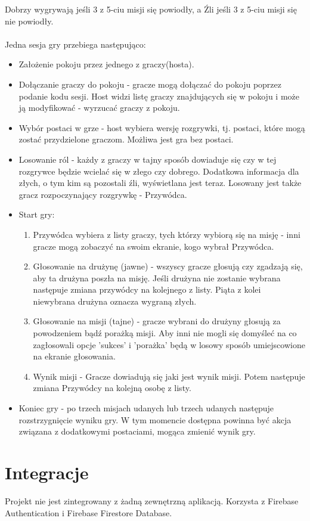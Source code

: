 \documentclass[12pt]{article}
\begin{document}
Dobrzy wygrywają jeśli 3 z 5-ciu misji się powiodły, a Źli jeśli 3 z 5-ciu misji się nie powiodły.
\\\\
Jedna sesja gry przebiega następująco:
\begin{itemize}
    \item Założenie pokoju przez jednego z graczy(hosta).
    \item Dołączanie graczy do pokoju - gracze mogą dołączać do pokoju poprzez podanie kodu sesji. Host widzi listę graczy znajdujących się w pokoju i może ją modyfikować - wyrzucać graczy z pokoju.
    \item Wybór postaci w grze - host wybiera wersję rozgrywki, tj. postaci, które mogą zostać przydzielone graczom. Możliwa jest gra bez postaci.
    \item Losowanie ról - każdy z graczy w tajny sposób dowiaduje się czy w tej rozgrywce będzie wcielać się w złego czy dobrego. Dodatkowa informacja dla złych, o tym kim są pozostali źli, wyświetlana jest teraz. Losowany jest także gracz rozpoczynający rozgrywkę - Przywódca.
    \item Start gry: \begin{enumerate}
        \item Przywódca wybiera z listy graczy, tych którzy wybiorą się na misję - inni gracze mogą zobaczyć na swoim ekranie, kogo wybrał Przywódca.
        \item Głosowanie na drużynę (jawne) - wszyscy gracze głosują czy zgadzają się, aby ta drużyna poszła na misję. Jeśli drużyna nie zostanie wybrana następuje zmiana przywódcy na kolejnego z listy. Piąta z kolei niewybrana drużyna oznacza wygraną złych.
        \item Głosowanie na misji (tajne) - gracze wybrani do drużyny głosują za powodzeniem bądź porażką misji. Aby inni nie mogli się domyśleć na co zagłosowali opcje 'sukces' i 'porażka' będą w losowy sposób umiejscowione na ekranie głosowania.
        \item Wynik misji - Gracze dowiadują się jaki jest wynik misji. Potem następuje zmiana Przywódcy na kolejną osobę z listy.
    \end{enumerate}
    \item Koniec gry - po trzech misjach udanych lub trzech udanych następuje rozstrzygnięcie wyniku gry. W tym momencie dostępna powinna być akcja związana z dodatkowymi postaciami, mogąca zmienić wynik gry.
\end{itemize}


\section{Integracje}
Projekt nie jest zintegrowany z żadną zewnętrzną aplikacją. Korzysta z Firebase Authentication i Firebase Firestore Database.
\end{document}
